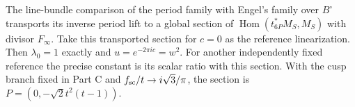 \begin{proposition}\label{fam:src:B.1.4}\label{fam:st:B.1.4}
The line-bundle comparison of the period family with Engel's family over $B^\circ$ transports its inverse period lift to a global section of $\operatorname{Hom}(t_{6P}^*M_S,M_S)$ with divisor $F_\infty$. Take this transported section for $c=0$ as the reference linearization. Then $\lambda_0=1$ exactly and $u=e^{-2\pi ic}=w^2$. For another independently fixed reference the precise constant is its scalar ratio with this section. With the cusp branch fixed in Part C and $f_{\rm sc}/t\to i\sqrt3/\pi$, the section is $P=(0,-\sqrt2t^2(t-1))$.
\end{proposition}

